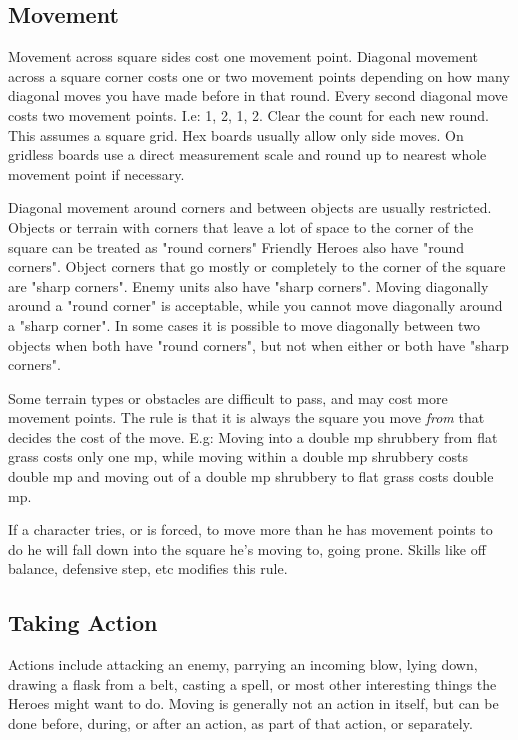 \subsection*{Movement}
Movement across square sides cost one movement point. Diagonal movement across a square corner costs one or two movement points depending on how many diagonal moves you have made before in that round. Every second diagonal move costs two movement points. I.e: 1, 2, 1, 2. Clear the count for each new round.
This assumes a square grid. Hex boards usually allow only side moves. On gridless boards use a direct measurement scale and round up to nearest whole movement point if necessary.

Diagonal movement around corners and between objects are usually restricted.
Objects or terrain with corners that leave a lot of space to the corner of the square can be treated as "round corners" Friendly Heroes also have "round corners".
Object corners that go mostly or completely to the corner of the square are "sharp corners". Enemy units also have "sharp corners".
Moving diagonally around a "round corner" is acceptable, while you cannot move diagonally around a "sharp corner". In some cases it is possible to move diagonally between two objects when both have "round corners", but not when either or both have "sharp corners".

Some terrain types or obstacles are difficult to pass, and may cost more movement points. The rule is that it is always the square you move \emph{from} that decides the cost of the move. E.g: Moving into a double mp shrubbery from flat grass costs only one mp, while moving within a double mp shrubbery costs double mp and moving out of a double mp shrubbery to flat grass costs double mp.

If a character tries, or is forced, to move more than he has movement points to do he will fall down into the square he's moving to, going prone. Skills like off balance, defensive step, etc modifies this rule.




\subsection*{Taking Action}
Actions include attacking an enemy, parrying an incoming blow, lying down, drawing a flask from a belt, casting a spell, or most other interesting things the Heroes might want to do. Moving is generally not an action in itself, but can be done before, during, or after an action, as part of that action, or separately.

